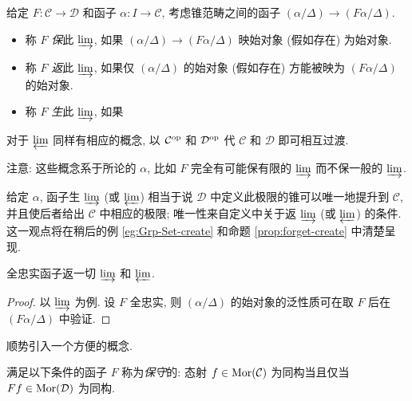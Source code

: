 \begin{definition}\label{def:create-limit}
	给定 $F: \mathcal{C} \to \mathcal{D}$ 和函子 $\alpha: I \to \mathcal{C}$, 考虑锥范畴之间的函子 $(\alpha/\Delta) \to (F\alpha/\Delta)$.
	\begin{itemize}
		\item 称 $F$ \emph{保}此 $\varinjlim$, 如果 $(\alpha/\Delta) \to (F\alpha/\Delta)$ 映始对象 (假如存在) 为始对象.
		\item 称 $F$ \emph{返}此 $\varinjlim$, 如果仅 $(\alpha/\Delta)$ 的始对象 (假如存在) 方能被映为 $(F\alpha/\Delta)$ 的始对象.
		\item 称 $F$ \emph{生}此 $\varinjlim$, 如果
	\end{itemize}
	对于 $\varprojlim$ 同样有相应的概念, 以 $\mathcal{C}^{\operatorname{op}}$ 和 $\mathcal{D}^{\operatorname{op}}$ 代 $\mathcal{C}$ 和 $\mathcal{D}$ 即可相互过渡.
\end{definition}

注意: 这些概念系于所论的 $\alpha$, 比如 $F$ 完全有可能保有限的 $\varinjlim$ 而不保一般的 $\varinjlim$.

给定 $\alpha$, 函子生 $\varinjlim$ (或 $\varprojlim$) 相当于说 $\mathcal{D}$ 中定义此极限的锥可以唯一地提升到 $\mathcal{C}$, 并且使后者给出 $\mathcal{C}$ 中相应的极限; 唯一性来自定义中关于返 $\varinjlim$ (或 $\varprojlim$) 的条件. 这一观点将在稍后的例 \ref{eg:Grp-Set-create} 和命题 \ref{prop:forget-create} 中清楚呈现. 

\begin{proposition}\label{prop:ff-reflect}
	全忠实函子返一切 $\varinjlim$ 和 $\varprojlim$.
\end{proposition}
\begin{proof}
	以 $\varinjlim$ 为例. 设 $F$ 全忠实, 则 $(\alpha/\Delta)$ 的始对象的泛性质可在取 $F$ 后在 $(F\alpha/\Delta)$ 中验证.
\end{proof}

顺势引入一个方便的概念.
\begin{definition}\label{def:conservative}
	满足以下条件的函子 $F$ 称为\emph{保守}的: 态射 $f \in \operatorname{Mor}(\mathcal{C})$ 为同构当且仅当 $Ff \in \operatorname{Mor}(\mathcal{D})$ 为同构. 
\end{definition}

